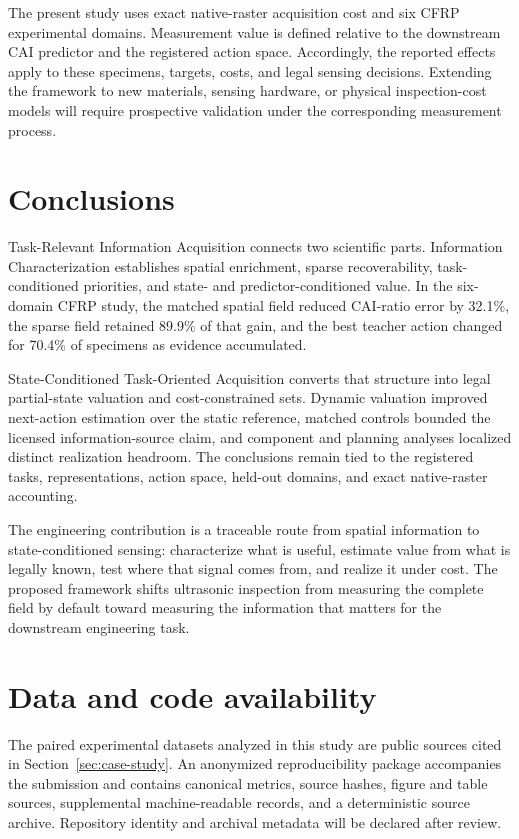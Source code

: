 \documentclass[preprint,12pt]{elsarticle}
\begin{document}
The present study uses exact native-raster acquisition cost and six CFRP
experimental domains. Measurement value is defined relative to the downstream
CAI predictor and the registered action space. Accordingly, the reported
effects apply to these specimens, targets, costs, and legal sensing decisions.
Extending the framework to new materials, sensing hardware, or physical
inspection-cost models will require prospective validation under the
corresponding measurement process.

\section{Conclusions}
\label{sec:conclusions}

Task-Relevant Information Acquisition connects two scientific parts. Information
Characterization establishes spatial enrichment, sparse recoverability, task-
conditioned priorities, and state- and predictor-conditioned value. In the
six-domain CFRP study, the matched spatial field reduced CAI-ratio error by
32.1\%, the sparse field retained 89.9\% of that gain, and the best teacher
action changed for 70.4\% of specimens as evidence accumulated.

State-Conditioned Task-Oriented Acquisition converts that structure into legal
partial-state valuation and cost-constrained sets. Dynamic valuation improved
next-action estimation over the static reference, matched controls bounded the
licensed information-source claim, and component and planning analyses
localized distinct realization headroom. The conclusions remain tied to the
registered tasks, representations, action space, held-out domains, and exact
native-raster accounting.

The engineering contribution is a traceable route from spatial information to
state-conditioned sensing: characterize what is useful, estimate value from
what is legally known, test where that signal comes from, and realize it under
cost. The proposed framework shifts ultrasonic inspection from measuring the
complete field by default toward measuring the information that matters for
the downstream engineering task.

\section*{Data and code availability}
The paired experimental datasets analyzed in this study are public sources
cited in Section~\ref{sec:case-study}. An anonymized reproducibility package
accompanies the submission and contains canonical metrics, source hashes,
figure and table sources, supplemental machine-readable records, and a
deterministic source archive. Repository identity and archival metadata will
be declared after review.
\end{document}
